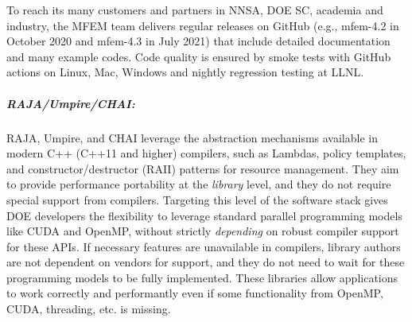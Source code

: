To reach its many customers and partners in NNSA, DOE SC,
academia and industry, the MFEM team delivers regular releases on GitHub
(e.g., mfem-4.2 in October 2020 and mfem-4.3 in July 2021) that include
detailed documentation and many example codes.  Code quality is ensured
by smoke tests with GitHub actions on Linux, Mac, Windows and nightly
regression testing at LLNL.

\subparagraph{RAJA/Umpire/CHAI:}
RAJA, Umpire, and CHAI leverage the abstraction mechanisms available in
modern C++ (C++11 and higher) compilers, such as Lambdas, policy
templates, and constructor/destructor (RAII) patterns for resource
management.  They aim to provide performance portability at the {\it
library} level, and they do not require special support from compilers.
Targeting this level of the software stack gives DOE developers the
flexibility to leverage standard parallel programming models like CUDA
and OpenMP, without strictly {\it depending} on robust compiler support
for these APIs.  If necessary features are unavailable in compilers,
library authors are not dependent on vendors for support, and they do not
need to wait for these programming models to be fully implemented.  These
libraries allow applications to work correctly and performantly even if
some functionality from OpenMP, CUDA, threading, etc. is missing.

